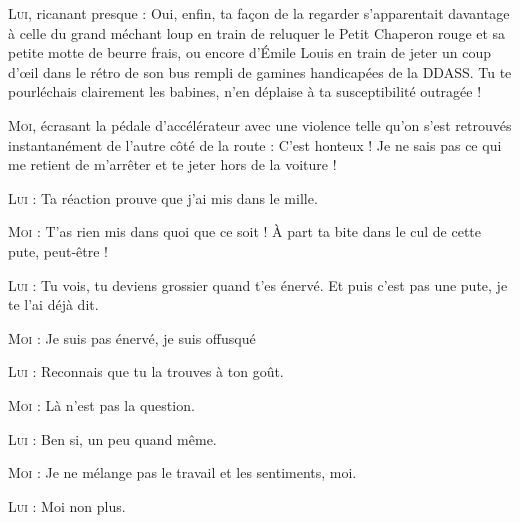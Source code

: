 \begin{dialogue}
\textsc{Lui}, ricanant presque : Oui, enfin, ta façon de la regarder s’apparentait davantage à celle du grand méchant loup en train de reluquer le Petit Chaperon rouge et sa petite motte de beurre frais, ou encore d’Émile Louis en train de jeter un coup d’œil dans le rétro de son bus rempli de gamines handicapées de la DDASS. Tu te pourléchais clairement les babines, n’en déplaise à ta susceptibilité outragée !

\textsc{Moi}, écrasant la pédale d’accélérateur avec une violence telle qu’on s’est retrouvés instantanément de l’autre côté de la route : C’est honteux ! Je ne sais pas ce qui me retient de m’arrêter et te jeter hors de la voiture !

\textsc{Lui} : Ta réaction prouve que j’ai mis dans le mille.

\textsc{Moi} : T’as rien mis dans quoi que ce soit ! À part ta bite dans le cul de cette pute, peut-être !

\textsc{Lui} : Tu vois, tu deviens grossier quand t’es énervé. Et puis c’est pas une pute, je te l’ai déjà dit.

\textsc{Moi} : Je suis pas énervé, je suis offusqué \!

\textsc{Lui} : Reconnais que tu la trouves à ton goût.

\textsc{Moi} : Là n’est pas la question.

\textsc{Lui} : Ben si, un peu quand même.

\textsc{Moi} : Je ne mélange pas le travail et les sentiments, moi.

\textsc{Lui} : Moi non plus.


\end{dialogue}

